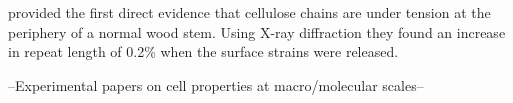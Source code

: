 \cite{Clair_2006} provided the first direct evidence that cellulose chains are under tension at the periphery of a normal wood stem. Using X-ray diffraction they found an increase in repeat length of 0.2\% when the surface strains were released. 

--Experimental papers on cell properties at macro/molecular scales--